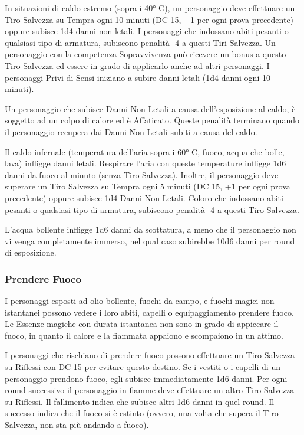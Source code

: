 \documentclass[a4paper,11pt,twoside,openany]{book}
\begin{document}
{In situazioni di caldo estremo (sopra i 40° C), un personaggio deve effettuare un Tiro Salvezza su Tempra ogni 10 minuti (DC 15, +1 per ogni prova precedente) oppure subisce 1d4 danni non letali. I personaggi che indossano abiti pesanti o qualsiasi tipo di armatura, subiscono penalità -4 a questi Tiri Salvezza. Un personaggio con la competenza Sopravvivenza può ricevere un bonus a questo Tiro Salvezza ed essere in grado di applicarlo anche ad altri personaggi. I personaggi Privi di Sensi iniziano a subire danni letali (1d4 danni ogni 10 minuti).

Un personaggio che subisce Danni Non Letali a causa dell'esposizione al caldo, è soggetto ad un colpo di calore ed è Affaticato. Queste penalità terminano quando il personaggio recupera dai Danni Non Letali subiti a causa del caldo.

Il caldo infernale (temperatura dell'aria sopra i 60° C, fuoco, acqua che bolle, lava) infligge danni letali. Respirare l'aria con queste temperature infligge 1d6 danni da fuoco al minuto (senza Tiro Salvezza). 
Inoltre, il personaggio deve superare un Tiro Salvezza su Tempra ogni 5 minuti (DC 15, +1 per ogni prova precedente) oppure subisce 1d4 Danni Non Letali. Coloro che indossano abiti pesanti o qualsiasi tipo di armatura, subiscono penalità -4 a questi Tiro Salvezza.

L'acqua bollente infligge 1d6 danni da scottatura, a meno che il personaggio non vi venga completamente immerso, nel qual caso subirebbe 10d6 danni per round di esposizione.

\subsubsection{Prendere Fuoco}

\label{prendere-fuoco}

I personaggi esposti ad olio bollente, fuochi da campo, e fuochi magici non istantanei possono vedere i loro abiti, capelli o equipaggiamento prendere fuoco. Le Essenze magiche con durata istantanea non sono in grado di appiccare il fuoco, in quanto il calore e la fiammata appaiono e scompaiono in un attimo.

I personaggi che rischiano di prendere fuoco possono effettuare un Tiro Salvezza su Riflessi con DC 15 per evitare questo destino. Se i vestiti o i capelli di un personaggio prendono fuoco, egli subisce immediatamente 1d6 danni. Per ogni round successivo il personaggio in fiamme deve effettuare un altro Tiro Salvezza su Riflessi. Il fallimento indica che subisce altri 1d6 danni in quel round. Il successo indica che il fuoco si è estinto (ovvero, una volta che supera il Tiro Salvezza, non sta più andando a fuoco).

}
\end{document}
